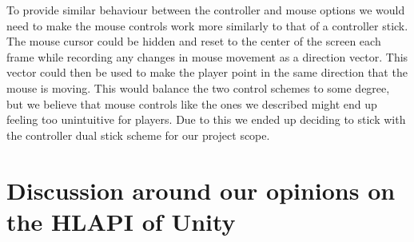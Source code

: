 To provide similar behaviour between the controller and mouse options we would need to make the mouse controls work more similarly to that of a controller stick. The mouse cursor could be hidden and reset to the center of the screen each frame while recording any changes in mouse movement as a direction vector. This vector could then be used to make the player point in the same direction that the mouse is moving. This would balance the two control schemes to some degree, but we believe that mouse controls like the ones we described might end up feeling too unintuitive for players. Due to this we ended up deciding to stick with the controller dual stick scheme for our project scope. 

\section{Discussion around our opinions on the HLAPI of Unity}

